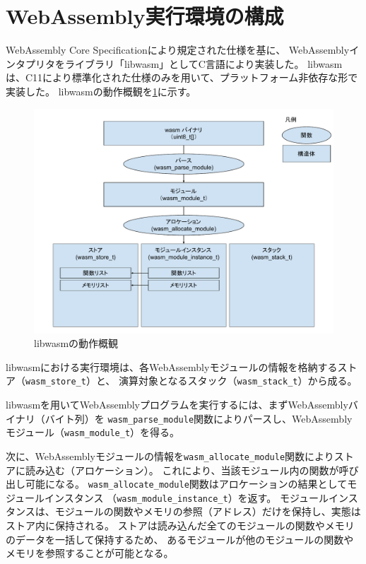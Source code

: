 \section{WebAssembly実行環境の構成}

WebAssembly Core Specification\cite{wasm_spec}により規定された仕様を基に、
WebAssemblyインタプリタをライブラリ「libwasm」としてC言語により実装した。
libwasmは、C11により標準化された仕様のみを用いて、プラットフォーム非依存な形で実装した。
libwasmの動作概観を\ref{fig:libwasm_arch}に示す。

\begin{figure}[htbp]
  \caption{libwasmの動作概観}
  \label{fig:libwasm_arch}
  \begin{center}
    \includegraphics[bb=0 0 960 720,width=12cm]{img/libwasm_arch.pdf}
  \end{center}
\end{figure}

libwasmにおける実行環境は、各WebAssemblyモジュールの情報を格納するストア（\verb|wasm_store_t|）と、
演算対象となるスタック（\verb|wasm_stack_t|）から成る。

libwasmを用いてWebAssemblyプログラムを実行するには、まずWebAssemblyバイナリ（バイト列）を
\verb|wasm_parse_module|関数によりパースし、WebAssemblyモジュール（\verb|wasm_module_t|）を得る。

次に、WebAssemblyモジュールの情報を\verb|wasm_allocate_module|関数によりストアに読み込む（アロケーション）。
これにより、当該モジュール内の関数が呼び出し可能になる。
\verb|wasm_allocate_module|関数はアロケーションの結果としてモジュールインスタンス
（\verb|wasm_module_instance_t|）を返す。
モジュールインスタンスは、モジュールの関数やメモリの参照（アドレス）だけを保持し、実態はストア内に保持される。
ストアは読み込んだ全てのモジュールの関数やメモリのデータを一括して保持するため、
あるモジュールが他のモジュールの関数やメモリを参照することが可能となる。

